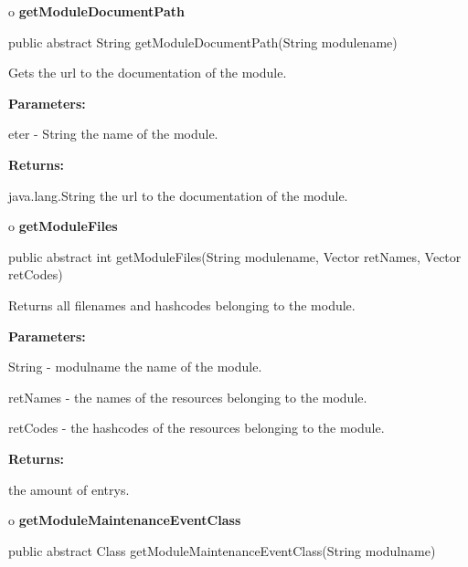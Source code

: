 o {\bf getModuleDocumentPath} 

\begin{PRE}
 public abstract String getModuleDocumentPath(String modulename)
\end{PRE}

\begin{description}
\htmlDD Gets the url to the documentation of the module. 

\begin{description}
\item {\bf Parameters:}  

eter - String the name of the module.  
\item {\bf Returns:}  

java.lang.String the url to the documentation of the module.  
\end{description}

\end{description}

o {\bf getModuleFiles} 

\begin{PRE}
 public abstract int getModuleFiles(String modulename,
                                    Vector retNames,
                                    Vector retCodes)
\end{PRE}

\begin{description}
\htmlDD Returns all filenames and hashcodes belonging to the module. 

\begin{description}
\item {\bf Parameters:}  

String - modulname the name of the module.  

retNames - the names of the resources belonging to the module.  

retCodes - the hashcodes of the resources belonging to the module.  
\item {\bf Returns:}  

the amount of entrys.  
\end{description}

\end{description}

o {\bf getModuleMaintenanceEventClass} 

\begin{PRE}
 public abstract Class getModuleMaintenanceEventClass(String modulname)
\end{PRE}

